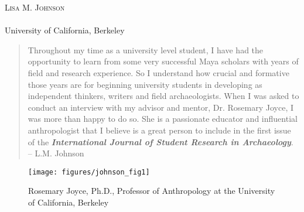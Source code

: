 \openingarticle
\def\ppages{\pagerange{Johnson:firstpage}{Johnson:lastpage}}
\def\shorttitle{Interview: Rosemary Joyce}
\def\shortauthor{Lisa M. Johnson}
\def\authormail{llomitola@berkeley.edu}
\def\maintitle{Rosemary Joyce, Ph.D. \textit{Professor of Anthropology at the University of California, Berkeley}}
\def\affiliation{University of California, Berkeley}
\begin{center}
	{\Large\scshape\shortauthor}\\[1em]
	\email \\
	\affiliation
\end{center}
\vspace{3em}
\midarticle
 \label{Johnson:firstpage}
 	

\blockquote{Throughout my time as a university level student, I have had the opportunity to learn from some very successful Maya scholars with years of field and research experience.  So I understand how crucial and formative those years are for beginning university students in developing as independent thinkers, writers and field archaeologists.  When I was asked to conduct an interview with my advisor and mentor, Dr. Rosemary Joyce, I was more than happy to do so.  She is a passionate educator and influential anthropologist that I believe is a great person to include in the first issue of the \textbf{\textit{International Journal of Student Research in Archaeology}}. -- L.M. Johnson}	
	
	\begin{figure}
		\texttt{[image: figures/johnson\_fig1]}
		\centering
		\caption{Rosemary Joyce, Ph.D., Professor of Anthropology at the University of California, Berkeley}
		\label{fig:Johnson:Fig1}
	\end{figure}
	
